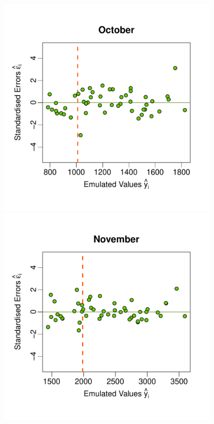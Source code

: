 \documentclass[a4paper, 12pt]{article}
\begin{document}
\begin{figure}
 \includegraphics[width=\scale]{Validation_Plots/Evaluation_Set/Evaluation_Scatter_10_Oct}\hspace{-1ex}
 \includegraphics[width=\scale]{Validation_Plots/Evaluation_Set/Evaluation_Scatter_11_Nov}\hspace{-1ex}

\end{figure}
\end{document}
